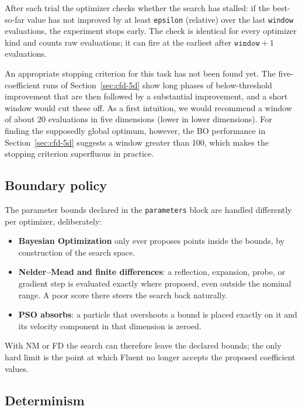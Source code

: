 After each trial the optimizer checks whether the search has stalled: if
the best-so-far value has not improved by at least \texttt{epsilon}
(relative) over the last \texttt{window} evaluations, the experiment stops
early.  The check is identical for every optimizer kind and counts raw
evaluations; it can fire at the earliest after $\texttt{window} + 1$
evaluations.

An appropriate stopping criterion for this task has not been found yet.
The five-coefficient runs of Section~\ref{sec:cfd-5d} show long phases of
below-threshold improvement that are then followed by a substantial
improvement, and a short window would cut these off.  As a first
intuition, we would recommend a window of about 20 evaluations in five
dimensions (lower in lower dimensions).  For finding the supposedly global
optimum, however, the BO performance in Section~\ref{sec:cfd-5d} suggests
a window greater than 100, which makes the stopping criterion superfluous
in practice.

\subsection{Boundary policy}
\label{sec:bounds}

The parameter bounds declared in the \texttt{parameters} block are handled
differently per optimizer, deliberately:

\begin{itemize}
  \item \textbf{Bayesian Optimization} only ever proposes points inside the
        bounds, by construction of the search space.
  \item \textbf{Nelder--Mead and finite differences}:
        a reflection, expansion, probe, or gradient step is evaluated exactly
        where proposed, even outside the nominal range.  A poor score there
        steers the search back naturally.
  \item \textbf{PSO absorbs}: a particle that overshoots a bound is placed
        exactly on it and its velocity component in that dimension is zeroed.
\end{itemize}

With NM or FD the search can therefore leave the declared bounds; the only
hard limit is the point at which Fluent no longer accepts the proposed
coefficient values.

\subsection{Determinism}
\label{sec:determinism}

